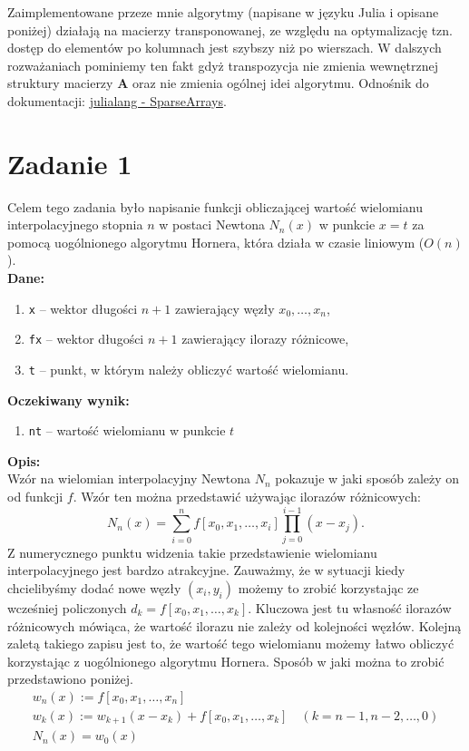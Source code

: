 \documentclass[]{article}
\newcommand{\mA}{\bm{A}}
\begin{document}
	\noindent Zaimplementowane przeze mnie algorytmy (napisane w języku Julia i opisane poniżej) działają na macierzy transponowanej, ze względu na optymalizację tzn. dostęp do elementów po kolumnach jest szybszy niż po wierszach. W dalszych rozważaniach pominiemy ten fakt gdyż transpozycja nie zmienia wewnętrznej struktury macierzy $\mA$ oraz nie zmienia ogólnej idei algorytmu.
	Odnośnik do dokumentacji: 
	\href{https://docs.julialang.org/en/v1/stdlib/SparseArrays/}{julialang - SparseArrays}.
	\section*{Zadanie 1}
	
	Celem tego zadania było napisanie funkcji obliczającej wartość wielomianu interpolacyjnego stopnia $n$ w postaci Newtona $N_{n}(x)$ w punkcie $x = t$ za pomocą uogólnionego algorytmu Hornera, która działa w czasie liniowym ($O(n)$). \\
	\textbf{Dane:}
	\begin{enumerate}[]
		\item \texttt{x} -- wektor długości $n+1$ zawierający węzły $x_0, \ldots, x_n$,
		\item \texttt{fx} -- wektor długości $n+1$ zawierający ilorazy różnicowe,
		\item \texttt{t} -- punkt, w którym należy obliczyć wartość wielomianu.
	\end{enumerate}
	\textbf{Oczekiwany wynik:}
	\begin{enumerate}[]
		\item \texttt{nt} -- wartość wielomianu w punkcie $t$
	\end{enumerate}
	\textbf{Opis:}\\
	\noindent Wzór na wielomian interpolacyjny Newtona $N_n$ pokazuje w jaki sposób zależy on od funkcji $f$. Wzór ten można przedstawić używając ilorazów różnicowych:
	$$N_n(x) = \sum_{i=0}^n f[x_0,x_{1}, \ldots, x_{i}] \prod_{j=0}^{i-1}(x-x_j).$$
	Z numerycznego punktu widzenia takie przedstawienie wielomianu interpolacyjnego jest bardzo atrakcyjne. Zauważmy, że w sytuacji kiedy chcielibyśmy dodać nowe węzły $(x_i, y_i)$ możemy to zrobić korzystając ze wcześniej policzonych $d_k = f[x_0,x_1, \ldots, x_k]$. Kluczowa jest tu własność ilorazów różnicowych mówiąca, że wartość ilorazu nie zależy od kolejności węzłów. Kolejną zaletą takiego zapisu jest to, że wartość tego wielomianu możemy łatwo obliczyć korzystając z uogólnionego algorytmu Hornera. Sposób w jaki można to zrobić przedstawiono poniżej.
	\begin{align*}
	&w_n(x) := f[x_0, x_1, \ldots, x_n]& \nonumber \\
	&w_k(x) := w_{k+1}(x-x_k)+ f[x_0, x_1, \ldots, x_k]	\quad(k=n-1, n-2, \ldots, 0)& \nonumber \\
	&N_n(x) = w_0(x) \nonumber \\
	\end{align*}
\end{document}
